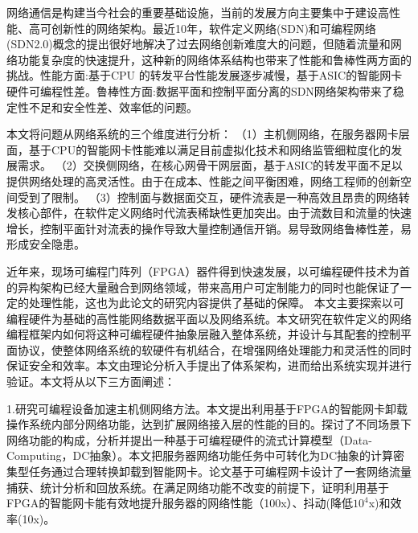 
\setcounter{page}{1}

%
%
%

网络通信是构建当今社会的重要基础设施，当前的发展方向主要集中于建设高性能、高可创新性的网络架构。最近10年，软件定义网络(SDN)和可编程网络(SDN2.0)概念的提出很好地解决了过去网络创新难度大的问题，但随着流量和网络功能复杂度的快速提升，这种新的网络体系结构也带来了性能和鲁棒性两方面的挑战。性能方面:基于CPU 的转发平台性能发展逐步减慢，基于ASIC的智能网卡硬件可编程性差。鲁棒性方面:数据平面和控制平面分离的SDN网络架构带来了稳定性不足和安全性差、效率低的问题。

本文将问题从网络系统的三个维度进行分析：
（1）主机侧网络，在服务器网卡层面，基于CPU的智能网卡性能难以满足目前虚拟化技术和网络监管细粒度化的发展需求。
（2）交换侧网络，在核心网骨干网层面，基于ASIC的转发平面不足以提供网络处理的高灵活性。由于在成本、性能之间平衡困难，网络工程师的创新空间受到了限制。
（3）控制面与数据面交互，硬件流表是一种高效且昂贵的网络转发核心部件，在软件定义网络时代流表稀缺性更加突出。由于流数目和流量的快速增长，控制平面针对流表的操作导致大量控制通信开销。易导致网络鲁棒性差，易形成安全隐患。

近年来，现场可编程门阵列（FPGA）器件得到快速发展，以可编程硬件技术为首的异构架构已经大量融合到网络领域，带来高用户可定制能力的同时也能保证了一定的处理性能，这也为此论文的研究内容提供了基础的保障。
本文主要探索以可编程硬件为基础的高性能网络数据平面以及网络系统。本文研究在软件定义的网络编程框架内如何将这种可编程硬件抽象层融入整体系统，并设计与其配套的控制平面协议，使整体网络系统的软硬件有机结合，在增强网络处理能力和灵活性的同时保证安全和效率。本文由理论分析入手提出了体系架构，进而给出系统实现并进行验证。本文将从以下三方面阐述：

1.研究可编程设备加速主机侧网络方法。本文提出利用基于FPGA的智能网卡卸载操作系统内部分网络功能，达到扩展网络接入层的性能的目的。探讨了不同场景下网络功能的构成，分析并提出一种基于可编程硬件的流式计算模型（Data-Computing，DC抽象）。本文把服务器网络功能任务中可转化为DC抽象的计算密集型任务通过合理转换卸载到智能网卡。论文基于可编程网卡设计了一套网络流量捕获、统计分析和回放系统。在满足网络功能不改变的前提下，证明利用基于FPGA的智能网卡能有效地提升服务器的网络性能（100x）、抖动(降低$10^4$x)和效率(10x)。

